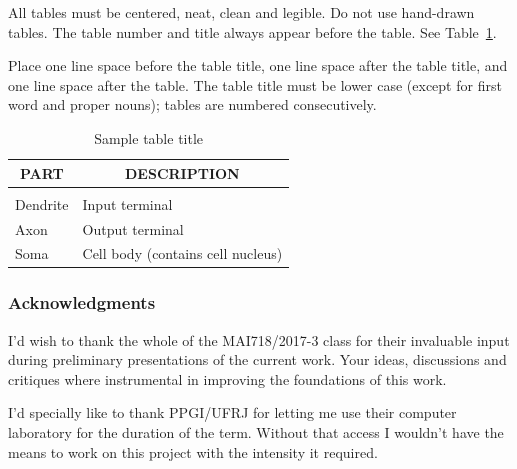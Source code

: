 \documentclass{article} %
\begin{document}
All tables must be centered, neat, clean and legible. Do not use hand-drawn
tables. The table number and title always appear before the table. See
Table~\ref{sample-table}.

Place one line space before the table title, one line space after the table
title, and one line space after the table. The table title must be lower case
(except for first word and proper nouns); tables are numbered consecutively.

\begin{table}[h]
\caption{Sample table title}
\label{sample-table}
\begin{center}
\begin{tabular}{ll}
\multicolumn{1}{c}{\bf PART}  &\multicolumn{1}{c}{\bf DESCRIPTION}
\\ \hline \\
Dendrite         &Input terminal \\
Axon             &Output terminal \\
Soma             &Cell body (contains cell nucleus) \\
\end{tabular}
\end{center}
\end{table}




\subsubsection*{Acknowledgments}
I'd wish to thank the whole of the MAI718/2017-3 class for their invaluable input during preliminary presentations of the current work. Your ideas, discussions and critiques where instrumental in improving the foundations of this work. 

I'd specially like to thank PPGI/UFRJ for letting me use their computer laboratory for the duration of the term. Without that access I wouldn't have the means to work on this project with the intensity it required.



\end{document}
